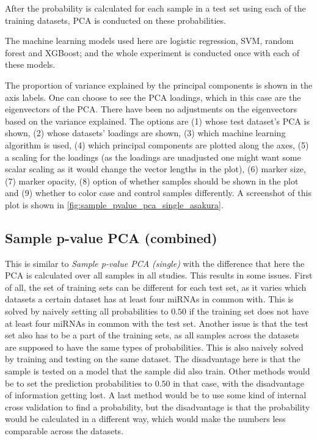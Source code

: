 {{{{{{{{{{{{{{{After the probability is calculated for each sample in a test set using each of the training datasets, PCA is conducted on these probabilities.

The machine learning models used here are logistic regression, SVM, random forest and XGBoost; and the whole experiment is conducted once with each of these models.

The proportion of variance explained by the principal components is shown in the axis labels. One can choose to see the PCA loadings, which in this case are the eigenvectors of the PCA. There have been no adjustments on the eigenvectors based on the variance explained. The options are (1) whose test dataset's PCA is shown, (2) whose datasets' loadings are shown, (3) which machine learning algorithm is used, (4) which principal components are plotted along the axes, (5) a scaling for the loadings (as the loadings are unadjusted one might want some scalar scaling as it would change the vector lengths in the plot), (6) marker size, (7) marker opacity, (8) option of whether samples should be shown in the plot and (9) whether to color case and control samples differently. A screenshot of this plot is shown in \autoref{fig:sample_pvalue_pca_single_asakura}.

\subsection{Sample p-value PCA (combined)}
\label{subsec:res_sample_pvalue_combined}
This is similar to \textit{Sample p-value PCA (single)} with the difference that here the PCA is calculated over all samples in all studies. This results in some issues. First of all, the set of training sets can be different for each test set, as it varies which datasets a certain dataset has at least four miRNAs in common with. This is solved by naively setting all probabilities to $0.50$ if the training set does not have at least four miRNAs in common with the test set. Another issue is that the test set also has to be a part of the training sets, as all samples across the datasets are supposed to have the same types of probabilities. This is also naively solved by training and testing on the same dataset. The disadvantage here is that the sample is tested on a model that the sample did also train. Other methods would be to set the prediction probabilities to $0.50$ in that case, with the disadvantage of information getting lost. A last method would be to use some kind of internal cross validation to find a probability, but the disadvantage is that the probability would be calculated in a different way, which would make the numbers less comparable across the datasets.

}}}}}}}}}}}}}}}
